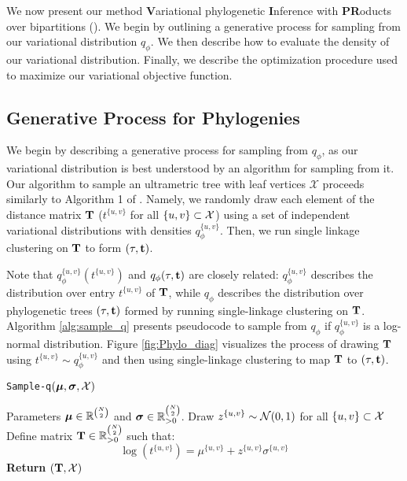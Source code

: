 

We now present our method \textbf{V}ariational phylogenetic \textbf{I}nference with \textbf{PR}oducts over bipartitions (\model). We begin by outlining a generative process for sampling from our variational distribution $q_\phi$. We then describe how to evaluate the density of our variational distribution. Finally, we describe the optimization procedure used to maximize our variational objective function. 

\subsection{Generative Process for Phylogenies}

We begin by describing a generative process for sampling from $q_\phi$, as our variational distribution is best understood by an algorithm for sampling from it. Our algorithm to sample an ultrametric tree with leaf vertices $\mathcal{X}$ proceeds similarly to Algorithm 1 of \citet{Bouckaert:2024}. Namely, we randomly draw each element of the distance matrix $\mathbf{T}$ ($t^{\{u,v\}}$ for all $\{u,v\} \subset \mathcal{X}$) using a set of independent variational distributions with densities $q_{\phi}^{\{u,v\}}$. Then, we run single linkage clustering on $\mathbf{T}$ to form $(\tau,\mathbf{t})$.

Note that $q_{\phi}^{\{u,v\}}(t^{\{u,v\}})$ and $q_{\phi}(\tau,\mathbf{t})$ are closely related: $q_{\phi}^{\{u,v\}}$ describes the distribution over entry $t^{\{u,v\}}$ of $\mathbf{T}$, while $q_\phi$ describes the distribution over phylogenetic trees $(\tau,\mathbf{t})$ formed by running single-linkage clustering on $\mathbf{T}$. Algorithm \ref{alg:sample_q} presents pseudocode to sample from $q_\phi$ if $q_{\phi}^{\{u,v\}}$ is a log-normal distribution. Figure \ref{fig:Phylo_diag} visualizes the process of drawing $\mathbf{T}$ using $t^{\{u,v\}} \sim q_\phi^{\{u,v\}}$ and then using single-linkage clustering to map $\mathbf{T}$ to $(\tau,\mathbf{t})$.

\begin{algorithm}[ht]
\caption{{\tt Sample-q}$(\boldsymbol{\mu},\boldsymbol{\sigma},\mathcal{X})$}\label{alg:sample_q}
\begin{algorithmic}[1]
 Parameters $\boldsymbol{\mu} \in \mathbb{R}^{\binom{N}{2}}$ and $\boldsymbol{\sigma} \in \mathbb{R}_{>0}^{\binom{N}{2}}$.
%
\STATE Draw $z^{\{u,v\}} \sim \mathcal{N}(0,1)$ for all $\{u,v\} \subset \mathcal{X}$
%
\STATE Define matrix $\mathbf{T} \in \mathbb{R}_{>0}^{\binom{N}{2}}$ such that:
$$
\log\left(t^{\{u,v\}}\right) = \mu^{\{u,v\}} + z^{\{u,v\}}\sigma^{\{u,v\}}
$$
\STATE \textbf{Return } $(\mathbf{T},\mathcal{X})$
\end{algorithmic}
\end{algorithm}

